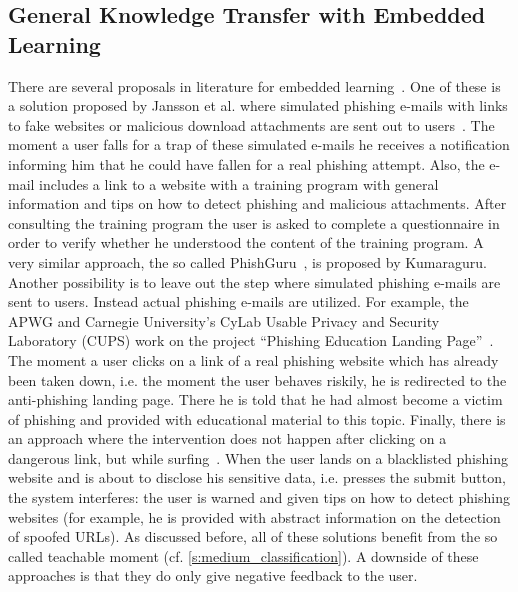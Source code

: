 \subsection{General Knowledge Transfer with Embedded Learning}

There are several proposals in literature for embedded learning~\cite{embedded2011jansson, kumaraguru2009phishguru,alnajim2009antiphishing}. 
One of these is a solution proposed by Jansson et al. where simulated phishing e-mails with links to fake websites or malicious download attachments are sent out to users~\cite{embedded2011jansson}. 
The moment a user falls for a trap of these simulated e-mails he receives a notification informing him that he could have fallen for a real phishing attempt. 
Also, the e-mail includes a link to a website with a training program with general information and tips on how to detect phishing and malicious attachments. 
After consulting the training program the user is asked to complete a questionnaire in order to verify whether he understood the content of the training program. 
A very similar approach, the so called PhishGuru~\cite{kumaraguru2009phishguru}, is proposed by Kumaraguru. 
Another possibility is to leave out the step where simulated phishing e-mails are sent to users. 
Instead actual phishing e-mails are utilized. 
For example, the APWG and Carnegie University's CyLab Usable Privacy and Security Laboratory (CUPS) work on the project ``Phishing Education Landing Page''~\cite{apwg2009landingpage}. 
The moment a user clicks on a link of a real phishing website which has already been taken down, i.e. the moment the user behaves riskily, he is redirected to the anti-phishing landing page.
There he is told that he had almost become a victim of phishing and provided with educational material to this topic. 
Finally, there is an approach where the intervention does not happen after clicking on a dangerous link, but while surfing~\cite{alnajim2009antiphishing}. 
When the user lands on a blacklisted phishing website and is about to disclose his sensitive data, i.e. presses the submit button, the system interferes: 
the user is warned and given tips on how to detect phishing websites (for example, he is provided with abstract information on the detection of spoofed URLs). 
As discussed before, all of these solutions benefit from the so called teachable moment (cf. \autoref{s:medium_classification}).
A downside of these approaches is that they do only give negative feedback to the user. 
